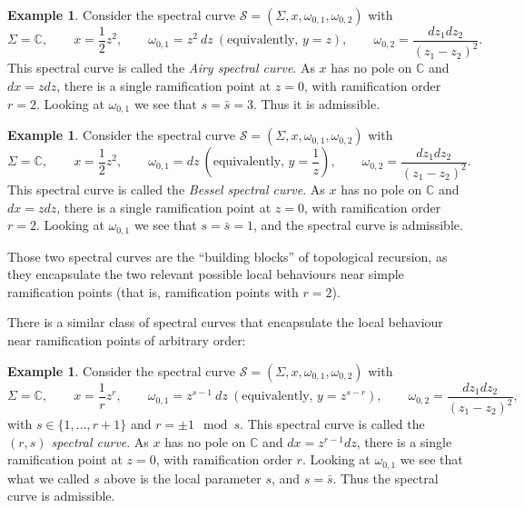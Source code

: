 \documentclass[reqno,oneside,11pt]{amsart}
\theoremstyle{plain}
\theoremstyle{definition}
\newtheorem{example}[theorem]{Example}
\theoremstyle{remark}
\numberwithin{equation}{section}
\begin{document}
\begin{example}\label{e:Airy}
Consider the spectral curve $\mathcal{S}=(\Sigma, x, \omega_{0,1}, \omega_{0,2})$ with 
\begin{equation}
\Sigma = \mathbb{C}, \qquad  x = \frac{1}{2} z^2, \qquad \omega_{0,1} = z^2\ dz \ (\text{equivalently, } y=z), \qquad \omega_{0,2} = \frac{dz_1 dz_2}{(z_1-z_2)^2}. 
\end{equation}
This spectral curve is called the \emph{Airy spectral curve}. As $x$ has no pole on $\mathbb{C}$ and $dx = z dz$, there is a single ramification point at $z=0$, with ramification order $r=2$. Looking at $\omega_{0,1}$ we see that $s=\bar s = 3$. Thus it is admissible.
\end{example}

\begin{example}\label{e:Bessel}
Consider the spectral curve $\mathcal{S}=(\Sigma, x, \omega_{0,1}, \omega_{0,2})$ with 
\begin{equation}
\Sigma = \mathbb{C}, \qquad  x = \frac{1}{2} z^2, \qquad \omega_{0,1} =  dz \ (\text{equivalently, } y=\frac{1}{z}), \qquad \omega_{0,2} = \frac{dz_1 dz_2}{(z_1-z_2)^2}. 
\end{equation}
This spectral curve is called the \emph{Bessel spectral curve}. As $x$ has no pole on $\mathbb{C}$ and $dx = z dz$, there is a single ramification point at $z=0$, with ramification order $r=2$. Looking at $\omega_{0,1}$ we see that $s=\bar s = 1$, and the spectral curve is admissible.
\end{example}

Those two spectral curves are the ``building blocks'' of topological recursion, as they encapsulate the two relevant possible local behaviours near simple ramification points (that is, ramification points with $r=2$).

There is a similar class of spectral curves that encapsulate the local behaviour near ramification points of arbitrary order:

\begin{example}\label{e:rs}
Consider the spectral curve $\mathcal{S}=(\Sigma, x, \omega_{0,1}, \omega_{0,2})$ with 
\begin{equation}
\Sigma = \mathbb{C}, \qquad  x = \frac{1}{r} z^r, \qquad \omega_{0,1} = z^{s-1}\ dz \ (\text{equivalently, } y=z^{s-r}), \qquad \omega_{0,2} = \frac{dz_1 dz_2}{(z_1-z_2)^2},
\end{equation}
with $s \in \{1,\ldots,r+1\}$ and $r= \pm 1 \mod s$. This spectral curve is called the \emph{$(r,s)$ spectral curve}. As $x$ has no pole on $\mathbb{C}$ and $dx = z^{r-1} dz$, there is a single ramification point at $z=0$, with ramification order $r$. Looking at $\omega_{0,1}$ we see that what we called $s$ above is the local parameter $s$, and $s=\bar s$. Thus the spectral curve is admissible.
\end{example}
\end{document}
